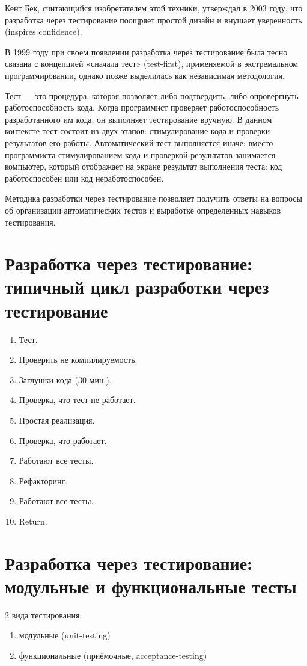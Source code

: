 \documentclass{article}
\begin{document}
    Кент Бек, считающийся изобретателем этой техники, утверждал в 2003 году, что разработка через тестирование поощряет простой дизайн и внушает уверенность (inspires confidence).

    В 1999 году при своем появлении разработка через тестирование была тесно связана с концепцией «сначала тест» (test-first), применяемой в экстремальном программировании, однако позже выделилась как независимая методология.

    Тест — это процедура, которая позволяет либо подтвердить, либо опровергнуть работоспособность кода. Когда программист проверяет работоспособность разработанного им кода, он выполняет тестирование вручную. В данном контексте тест состоит из двух этапов: стимулирование кода и проверки результатов его работы. Автоматический тест выполняется иначе: вместо программиста стимулированием кода и проверкой результатов занимается компьютер, который отображает на экране результат выполнения теста: код работоспособен или код неработоспособен. 

    Методика разработки через тестирование позволяет получить ответы на вопросы об организации автоматических тестов и выработке определенных навыков тестирования.

\section{Разработка через тестирование: типичный цикл разработки через тестирование}
    \begin{enumerate}
        \item Тест.
        \item Проверить не компилируемость.
        \item Заглушки кода (30 мин.).
        \item Проверка, что тест не работает.
        \item Простая реализация.
        \item Проверка, что работает.
        \item Работают все тесты.
        \item Рефакторинг.
        \item Работают все тесты.
        \item Return.
    \end{enumerate}

\section{Разработка через тестирование: модульные и функциональные тесты}
    2 вида тестирования:
    \begin{enumerate}
        \item модульные (unit-testing)
        \item функциональные (приёмочные, acceptance-testing)
    \end{enumerate}
\end{document}
